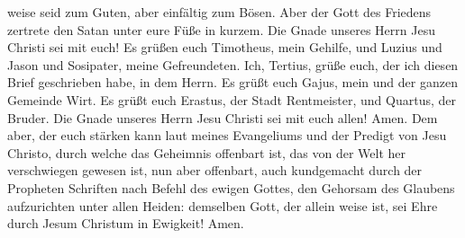 weise seid zum Guten, aber einfältig zum Bösen.  Aber der
Gott des Friedens zertrete den Satan unter eure Füße in kurzem. Die
Gnade unseres Herrn Jesu Christi sei mit euch!  Es grüßen
euch Timotheus, mein Gehilfe, und Luzius und Jason und Sosipater, meine
Gefreundeten.  Ich, Tertius, grüße euch, der ich diesen
Brief geschrieben habe, in dem Herrn.  Es grüßt euch
Gajus, mein und der ganzen Gemeinde Wirt. Es grüßt euch Erastus, der
Stadt Rentmeister, und Quartus, der Bruder.  Die Gnade
unseres Herrn Jesu Christi sei mit euch allen! Amen.  Dem
aber, der euch stärken kann laut meines Evangeliums und der Predigt von
Jesu Christo, durch welche das Geheimnis offenbart ist, das von der Welt
her verschwiegen gewesen ist,  nun aber offenbart, auch
kundgemacht durch der Propheten Schriften nach Befehl des ewigen Gottes,
den Gehorsam des Glaubens aufzurichten unter allen Heiden:
 demselben Gott, der allein weise ist, sei Ehre durch
Jesum Christum in Ewigkeit! Amen.
